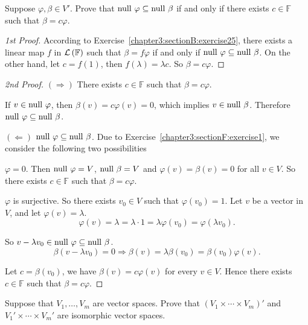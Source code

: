 \begin{exercise}\label{chapter3:sectionF:exercise6}
    Suppose $\varphi, \beta \in V'$. Prove that $\operatorname{null}\,{\varphi} \subseteq \operatorname{null}\,{\beta}$ if and only if there exists $c \in \mathbb{F}$ such that $\beta = c\varphi$.
\end{exercise}

\begin{proof}[1st Proof]
    According to Exercise~\ref{chapter3:sectionB:exercise25}, there exists a linear map $f$ in $\mathcal{L}\left({\mathbb{F}}\right)$ such that $\beta = f\varphi$ if and only if $\operatorname{null}\,{\varphi}\subseteq\operatorname{null}\,{\beta}$. On the other hand, let $c = f(1)$, then $f(\lambda) = \lambda c$. So $\beta = c\varphi$.
\end{proof}

\begin{proof}[2nd Proof]
    $(\Rightarrow)$ There exists $c \in \mathbb{F}$ such that $\beta = c\varphi$.

    If $v\in \operatorname{null}\,{\varphi}$, then $\beta(v) = c\varphi(v) = 0$, which implies $v\in \operatorname{null}\,{\beta}$. Therefore $\operatorname{null}\,{\varphi} \subseteq \operatorname{null}\,{\beta}$.

    \bigskip

    $(\Leftarrow)$ $\operatorname{null}\,{\varphi} \subseteq \operatorname{null}\,{\beta}$. Due to Exercise~\ref{chapter3:sectionF:exercise1}, we consider the following two possibilities

    $\varphi = 0$. Then $\operatorname{null}\,{\varphi} = V$, $\operatorname{null}\,{\beta} = V$ and $\varphi(v) = \beta(v) = 0$ for all $v\in V$. So there exists $c\in\mathbb{F}$ such that $\beta = c\varphi$.

    $\varphi$ is surjective. So there exists $v_{0}\in V$ such that $\varphi(v_{0}) = 1$. Let $v$ be a vector in $V$, and let $\varphi(v) = \lambda$.
    \[
        \varphi(v) = \lambda = \lambda\cdot 1 = \lambda \varphi(v_{0}) = \varphi(\lambda v_{0}).
    \]

    So $v - \lambda v_{0}\in \operatorname{null}\,{\varphi}\subseteq \operatorname{null}\,{\beta}$.
    \[
        \beta(v - \lambda v_{0}) = 0 \Longrightarrow \beta(v) = \lambda\beta(v_{0}) = \beta(v_{0})\varphi(v).
    \]

    Let $c = \beta(v_{0})$, we have $\beta(v) = c\varphi(v)$ for every $v\in V$. Hence there exists $c\in\mathbb{F}$ such that $\beta = c\varphi$.
\end{proof}
\newpage

\begin{exercise}
    Suppose that $V_{1} , \ldots, V_{m}$ are vector spaces. Prove that ${(V_{1} \times \cdots \times V_{m})}'$ and $V_{1}' \times \cdots \times V_{m}'$ are isomorphic vector spaces.
\end{exercise}


